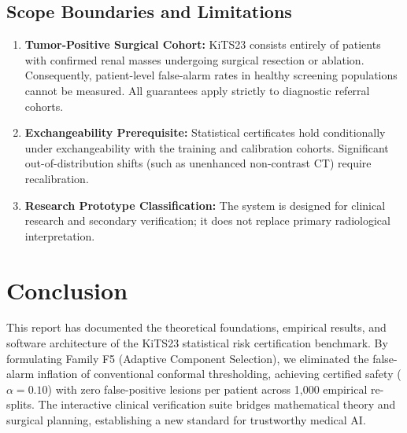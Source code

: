 \documentclass[11pt,a4paper]{report}
\begin{document}
\section{Scope Boundaries and Limitations}
\begin{enumerate}
    \item \textbf{Tumor-Positive Surgical Cohort:} KiTS23 consists entirely of patients with confirmed renal masses undergoing surgical resection or ablation. Consequently, patient-level false-alarm rates in healthy screening populations cannot be measured. All guarantees apply strictly to diagnostic referral cohorts.
    \item \textbf{Exchangeability Prerequisite:} Statistical certificates hold conditionally under exchangeability with the training and calibration cohorts. Significant out-of-distribution shifts (such as unenhanced non-contrast CT) require recalibration.
    \item \textbf{Research Prototype Classification:} The system is designed for clinical research and secondary verification; it does not replace primary radiological interpretation.
\end{enumerate}

\chapter{Conclusion}
This report has documented the theoretical foundations, empirical results, and software architecture of the KiTS23 statistical risk certification benchmark. By formulating Family F5 (Adaptive Component Selection), we eliminated the false-alarm inflation of conventional conformal thresholding, achieving certified safety ($\alpha = 0.10$) with zero false-positive lesions per patient across 1,000 empirical re-splits. The interactive clinical verification suite bridges mathematical theory and surgical planning, establishing a new standard for trustworthy medical AI.



\end{document}

